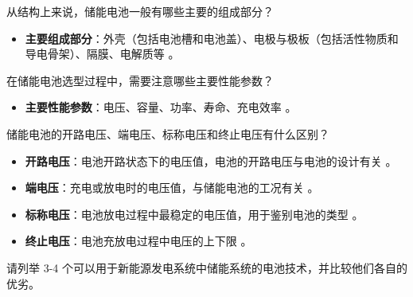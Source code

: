 \begin{problem}\label{exer:think_03_wind_07}
从结构上来说，储能电池一般有哪些主要的组成部分？
\end{problem}

\begin{solution}
\begin{itemize}
\item \textbf{主要组成部分}：外壳（包括电池槽和电池盖）、电极与极板（包括活性物质和导电骨架）、隔膜、电解质等 。
\end{itemize}
\end{solution}

\begin{problem}\label{exer:think_03_wind_08}
在储能电池选型过程中，需要注意哪些主要性能参数？
\end{problem}

\begin{solution}
\begin{itemize}
\item \textbf{主要性能参数}：电压、容量、功率、寿命、充电效率 。
\end{itemize}
\end{solution}

\begin{problem}\label{exer:think_03_wind_09}
储能电池的开路电压、端电压、标称电压和终止电压有什么区别？
\end{problem}

\begin{solution}
\begin{itemize}
\item \textbf{开路电压}：电池开路状态下的电压值，电池的开路电压与电池的设计有关 。
\item \textbf{端电压}：充电或放电时的电压值，与储能电池的工况有关 。
\item \textbf{标称电压}：电池放电过程中最稳定的电压值，用于鉴别电池的类型 。
\item \textbf{终止电压}：电池充放电过程中电压的上下限 。
\end{itemize}
\end{solution}

\begin{problem}\label{exer:think_03_wind_10}
请列举 3-4 个可以用于新能源发电系统中储能系统的电池技术，并比较他们各自的优劣。
\end{problem}

